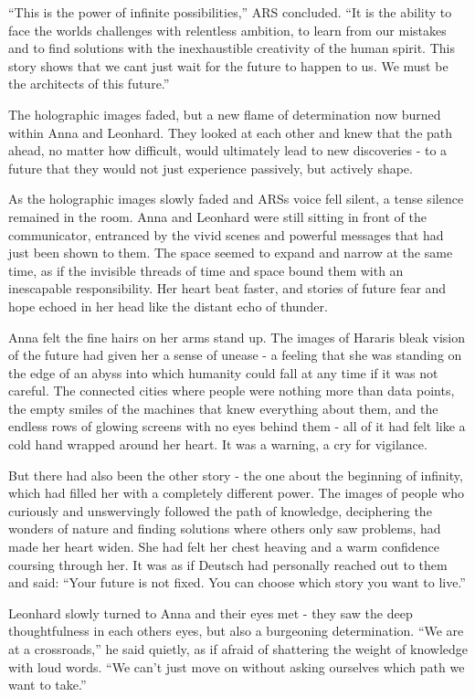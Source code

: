 \documentclass[
]{article}
\begin{document}
``This is the power of infinite possibilities,'' ARS concluded. ``It is
the ability to face the world\textquotesingle s challenges with
relentless ambition, to learn from our mistakes and to find solutions
with the inexhaustible creativity of the human spirit. This story shows
that we can\textquotesingle t just wait for the future to happen to us.
We must be the architects of this future.''

The holographic images faded, but a new flame of determination now
burned within Anna and Leonhard. They looked at each other and knew that
the path ahead, no matter how difficult, would ultimately lead to new
discoveries - to a future that they would not just experience passively,
but actively shape.

As the holographic images slowly faded and ARS\textquotesingle s voice
fell silent, a tense silence remained in the room. Anna and Leonhard
were still sitting in front of the communicator, entranced by the vivid
scenes and powerful messages that had just been shown to them. The space
seemed to expand and narrow at the same time, as if the invisible
threads of time and space bound them with an inescapable responsibility.
Her heart beat faster, and stories of future fear and hope echoed in her
head like the distant echo of thunder.

Anna felt the fine hairs on her arms stand up. The images of
Harari\textquotesingle s bleak vision of the future had given her a
sense of unease - a feeling that she was standing on the edge of an
abyss into which humanity could fall at any time if it was not careful.
The connected cities where people were nothing more than data points,
the empty smiles of the machines that knew everything about them, and
the endless rows of glowing screens with no eyes behind them - all of it
had felt like a cold hand wrapped around her heart. It was a warning, a
cry for vigilance.

But there had also been the other story - the one about the beginning of
infinity, which had filled her with a completely different power. The
images of people who curiously and unswervingly followed the path of
knowledge, deciphering the wonders of nature and finding solutions where
others only saw problems, had made her heart widen. She had felt her
chest heaving and a warm confidence coursing through her. It was as if
Deutsch had personally reached out to them and said: ``Your future is
not fixed. You can choose which story you want to live.''

Leonhard slowly turned to Anna and their eyes met - they saw the deep
thoughtfulness in each other\textquotesingle s eyes, but also a
burgeoning determination. ``We are at a crossroads,'' he said quietly,
as if afraid of shattering the weight of knowledge with loud words. ``We
can't just move on without asking ourselves which path we want to
take.''
\end{document}
